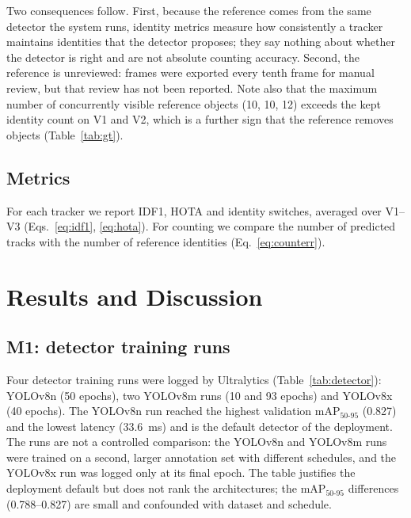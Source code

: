 \documentclass[11pt,a4paper]{article}
\begin{document}
Two consequences follow. First, because the reference comes from the same detector the system runs, identity metrics measure how consistently a tracker maintains identities that the detector proposes; they say nothing about whether the detector is right and are not absolute counting accuracy. Second, the reference is unreviewed: frames were exported every tenth frame for manual review, but that review has not been reported. Note also that the maximum number of concurrently visible reference objects (10, 10, 12) exceeds the kept identity count on V1 and V2, which is a further sign that the reference removes objects (Table~\ref{tab:gt}).

\subsection{Metrics}
For each tracker we report IDF1, HOTA and identity switches, averaged over V1--V3 (Eqs.~\ref{eq:idf1}, \ref{eq:hota}). For counting we compare the number of predicted tracks with the number of reference identities (Eq.~\ref{eq:counterr}).

\section{Results and Discussion}\label{sec:results}

\subsection{M1: detector training runs}\label{sec:res-det}
Four detector training runs were logged by Ultralytics (Table~\ref{tab:detector}): YOLOv8n (50 epochs), two YOLOv8m runs (10 and 93 epochs) and YOLOv8x (40 epochs). The YOLOv8n run reached the highest validation mAP$_{50\text{-}95}$ (0.827) and the lowest latency (33.6~ms) and is the default detector of the deployment. The runs are not a controlled comparison: the YOLOv8n and YOLOv8m runs were trained on a second, larger annotation set with different schedules, and the YOLOv8x run was logged only at its final epoch. The table justifies the deployment default but does not rank the architectures; the mAP$_{50\text{-}95}$ differences (0.788--0.827) are small and confounded with dataset and schedule.
\end{document}
